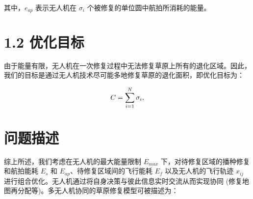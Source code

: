 \documentclass[AutoFakeBold]{LZUThesis}
\begin{document}
其中，$e_{ap}$ 表示无人机在 $\sigma_i$ 个被修复的单位圆中航拍所消耗的能量。

\section{1.2 优化目标}

由于能量有限，无人机在一次修复过程中无法修复草原上所有的退化区域。因此，我们的目标是通过无人机技术尽可能多地修复草原的退化面积，即优化目标为：

\begin{equation} \label{maximize-the-sum}
	\begin{small}
		C = \sum^N_{i=1}\sigma_i,
	\end{small}
\end{equation}

\section{问题描述}

综上所述，我们考虑在无人机的最大能量限制 $E_{max}$ 下，对待修复区域的播种修复和航拍能耗 $E_s$ 和 $E_{ap}$、待修复区域间的飞行能耗 $E_f$ 以及无人机的飞行轨迹 $x_{ij}$ 进行组合优化。无人机通过将自身决策与彼此信息实时交流从而实现协同 (修复地图再分配等)。多无人机协同的草原修复模型可被描述为：
\end{document}
